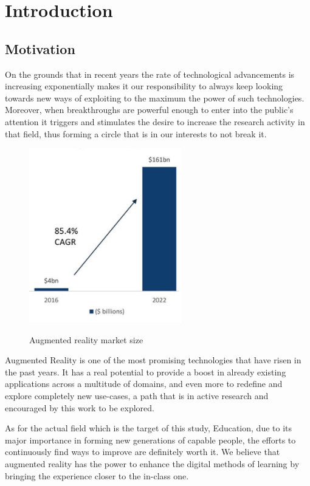 \documentclass[12 pct]{report}
\begin{document}
\listoffigures

\listoftables

\chapter{Introduction}

\section{Motivation}
On the grounds that in recent years the rate of technological advancements is increasing exponentially makes it our responsibility to always keep looking towards new ways of exploiting to the maximum the power of such technologies. Moreover, when breakthroughs are powerful enough to enter into the public's attention it triggers and stimulates the desire to increase the research activity in that field, thus forming a circle that is in our interests to not break it.

\begin{figure}[H]
\includegraphics[width=0.59\textwidth]{ar-chart}
\centering
\label{fig:feature-points}
\caption{Augmented reality market size \cite{consultancy.uk}}
\end{figure}

Augmented Reality is one of the most promising technologies that have risen in the past years. It has a real potential to provide a boost in already existing applications across a multitude of domains, and even more to redefine and explore completely new use-cases, a path that is in active research and encouraged
 by this work to be explored.

As for the actual field which is the target of this study, Education, due to its major importance in forming new generations of capable people, the efforts to continuously find ways to improve are definitely worth it. We believe that augmented reality has the power to enhance the digital methods of learning by bringing the experience closer to the in-class one.
\end{document}
